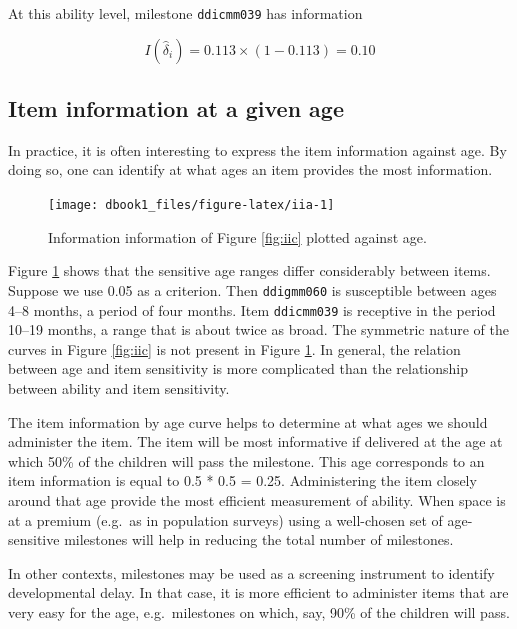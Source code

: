 \documentclass[
]{book}
\begin{document}
At this ability level, milestone \texttt{ddicmm039} has information

\[I(\hat\delta_i)=0.113 \times (1-0.113) = 0.10\]

\hypertarget{item-information-at-a-given-age}{%
\subsection{Item information at a given age}\label{item-information-at-a-given-age}}

In practice, it is often interesting to express the item information against age. By doing so, one can identify at what ages an item provides the most information.

\begin{figure}

{\centering \texttt{[image: dbook1\_files/figure-latex/iia-1]} 

}

\caption{Information information of Figure \ref{fig:iic} plotted against age.}\label{fig:iia}
\end{figure}



Figure \ref{fig:iia} shows that the sensitive age ranges differ considerably between items. Suppose we use 0.05 as a criterion. Then \texttt{ddigmm060} is susceptible between ages 4--8 months, a period of four months. Item \texttt{ddicmm039} is receptive in the period 10--19 months, a range that is about twice as broad. The symmetric nature of the curves in Figure \ref{fig:iic} is not present in Figure \ref{fig:iia}. In general, the relation between age and item sensitivity is more complicated than the relationship between ability and item sensitivity.

The item information by age curve helps to determine at what ages we should administer the item. The item will be most informative if delivered at the age at which 50\% of the children will pass the milestone. This age corresponds to an item information is equal to 0.5 * 0.5 = 0.25. Administering the item closely around that age provide the most efficient measurement of ability. When space is at a premium (e.g.~as in population surveys) using a well-chosen set of age-sensitive milestones will help in reducing the total number of milestones.

In other contexts, milestones may be used as a screening instrument to identify developmental delay. In that case, it is more efficient to administer items that are very easy for the age, e.g.~milestones on which, say, 90\% of the children will pass.
\end{document}
